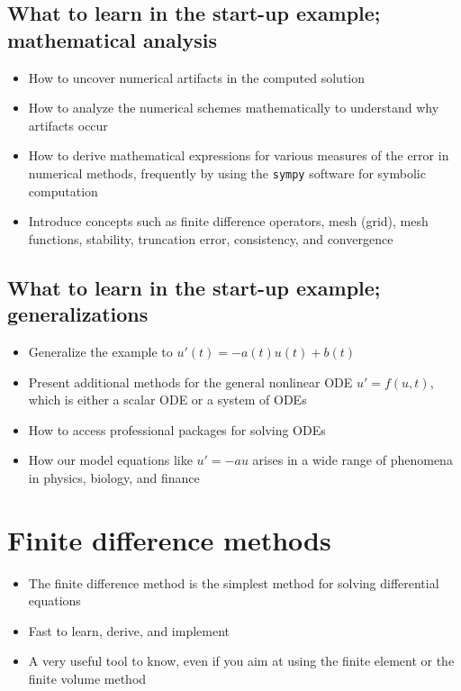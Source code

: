 \documentclass[%
oneside,                 %
final,                   %
10pt]{article}
\begin{document}
\noindent
\subsection*{What to learn in the start-up example; mathematical analysis}

\begin{itemize}
 \item How to uncover numerical artifacts in the computed solution

 \item How to analyze the numerical schemes mathematically to understand
   why artifacts occur

 \item How to derive mathematical expressions for various measures of
   the error in numerical methods, frequently by using the \texttt{sympy} software
   for symbolic computation

 \item Introduce concepts such as finite difference operators,
   mesh (grid), mesh functions,
   stability, truncation error, consistency, and convergence
\end{itemize}

\noindent
\subsection*{What to learn in the start-up example; generalizations}

\begin{itemize}
 \item Generalize the example to $u'(t)=-a(t)u(t) + b(t)$

 \item Present additional methods for the general nonlinear ODE $u'=f(u,t)$,
   which is either a scalar ODE or a system of ODEs

 \item How to access professional packages for solving ODEs

 \item How our model equations like $u'=-au$ arises in a wide range
   of phenomena in physics, biology, and finance
\end{itemize}

\noindent
\section*{Finite difference methods}
\label{decay:fdm}

\begin{itemize}
 \item The finite difference method is the simplest method
   for solving differential equations

 \item Fast to learn, derive, and implement

 \item A very useful tool to know, even if you aim at using the finite element
   or the finite volume method
\end{itemize}
\end{document}
